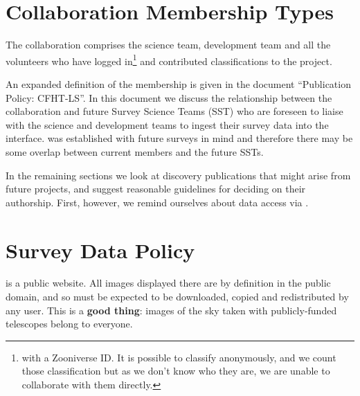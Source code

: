 \documentclass[a4paper]{article}
\begin{document}
\section{Collaboration Membership Types}
\label{sec:members}

The \sw collaboration comprises the \sw science team, development team and all the volunteers who have 
logged in\footnote{with a Zooniverse ID. It is possible to classify anonymously, and we count those classification but as we don't know who they are, we are unable to collaborate with them directly.} and contributed classifications to the project. 

An expanded definition of the \sw membership is given in the document ``\sw Publication Policy: CFHT-LS''.  In this document we discuss the relationship between the \sw collaboration and future Survey Science Teams (SST) who are foreseen to liaise with the \sw science and development teams to ingest their survey data into the \sw interface. \sw was established with future surveys in mind and therefore there may be some overlap between current \sw members and the future SSTs.


In the remaining sections we look at discovery publications that might
arise from future \sw projects, and suggest reasonable guidelines for
deciding on their authorship. First, however, we remind ourselves about data
access via \sw.



\section{Survey Data Policy}
\label{sec:data}

\sw is a public website. All images displayed there are by definition in the
public domain, and so must be expected to be downloaded, copied and
redistributed by any \sw user. This is a \textbf{good thing}: images of the sky taken
with publicly-funded telescopes belong to everyone. 
\end{document}
